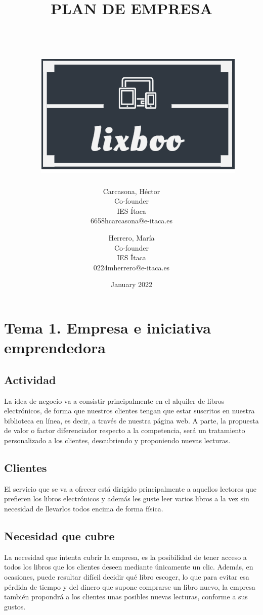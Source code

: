 \documentclass[openany,overnay,a4paper, twoside, 12pt]{book}
\title{PLAN DE EMPRESA\\
\\\\\
\newline
\newline
\newline
\includegraphics[scale = 0.6]{imagenes/lixboo.png}}
\author{
    Carcasona, Héctor\\
    Co-founder\\
    IES Ítaca\\
    6658hcarcasona@e-itaca.es
  \and
    Herrero, María\\
   Co-founder\\
    IES Ítaca\\
    0224mherrero@e-itaca.es}
\date{January 2022}
\begin{document}
\let\cleardoublepage\clearpage %

\maketitle
\tableofcontents %
\setcounter{chapter}{1}%
\chapter*{Tema 1. Empresa e iniciativa emprendedora}



\justifying %
\section{Actividad}
La idea de negocio va a consistir principalmente en el alquiler de libros electrónicos, de forma que nuestros clientes tengan que estar suscritos en nuestra biblioteca en línea, es decir, a través de nuestra página web. A parte, la propuesta de valor o factor diferenciador respecto a la competencia, será un tratamiento personalizado a los clientes, descubriendo y proponiendo nuevas lecturas.

\section{Clientes}
El servicio que se va a ofrecer está dirigido principalmente a aquellos lectores que prefieren los libros electrónicos y además les guste leer varios libros a la vez sin necesidad de llevarlos todos encima de forma física.

\section{Necesidad que cubre}
La necesidad que intenta cubrir la empresa, es la posibilidad de tener acceso a todos los libros que los clientes deseen mediante únicamente un clic. Además, en ocasiones, puede resultar difícil decidir qué libro escoger, lo que para evitar esa pérdida de tiempo y del dinero que supone comprarse un libro nuevo, la empresa también propondrá a los clientes unas posibles nuevas lecturas, conforme a sus gustos.
\end{document}
